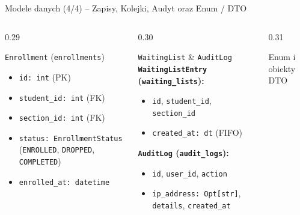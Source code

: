 \documentclass[aspectratio=169, 10pt, xcolor=table]{beamer}
\begin{document}
\begin{frame}{Modele danych (4/4) -- Zapisy, Kolejki, Audyt oraz Enum / DTO}
    \scriptsize
    \begin{columns}[T, onlytextwidth]
        \begin{column}{0.29\textwidth}
            \begin{block}{\texttt{Enrollment} (\texttt{enrollments})}
                \begin{itemize}
                    \item \texttt{id: int} (PK)
                    \item \texttt{student\_id: int} (FK)
                    \item \texttt{section\_id: int} (FK)
                    \item \texttt{status: EnrollmentStatus} (\texttt{ENROLLED}, \texttt{DROPPED}, \texttt{COMPLETED})
                    \item \texttt{enrolled\_at: datetime}
                \end{itemize}
            \end{block}
        \end{column}
        \begin{column}{0.30\textwidth}
            \begin{block}{\texttt{WaitingList} \& \texttt{AuditLog}}
                \textbf{\texttt{WaitingListEntry} (\texttt{waiting\_lists}):}
                \begin{itemize}
                    \item \texttt{id}, \texttt{student\_id}, \texttt{section\_id}
                    \item \texttt{created\_at: dt} (FIFO)
                \end{itemize}
                \vspace{2pt}
                \textbf{\texttt{AuditLog} (\texttt{audit\_logs}):}
                \begin{itemize}
                    \item \texttt{id}, \texttt{user\_id}, \texttt{action}
                    \item \texttt{ip\_address: Opt[str]}, \texttt{details}, \texttt{created\_at}
                \end{itemize}
            \end{block}
        \end{column}
        \begin{column}{0.31\textwidth}
            \begin{exampleblock}{Enum i obiekty DTO}

\end{exampleblock}
\end{column}
\end{columns}
\end{frame}
\end{document}
